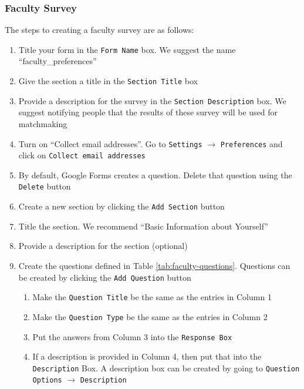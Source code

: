 %
%
\subsubsection{Faculty Survey}

The steps to creating a faculty survey are as follows:
\begin{enumerate}
	\item Title your form in the \texttt{Form Name} box. We suggest the name ``faculty\_preferences''
	\item Give the section a title in the \texttt{Section Title} box
	\item Provide a description for the survey in the \texttt{Section Description} box.
			We suggest notifying people that the results of these survey will be used for matchmaking
	\item Turn on ``Collect email addresses''.  Go to \texttt{Settings} $\rightarrow$ \texttt{Preferences} and click on \texttt{Collect email addresses}
	\item By default, Google Forms creates a question.  Delete that question using the \texttt{Delete} button
	
	\item Create a new section by clicking the \texttt{Add Section} button
	\item Title the section.  We recommend ``Basic Information about Yourself''
	\item Provide a description for the section (optional)
	\item Create the questions defined in Table \ref{tab:faculty-questions}.  Questions can be created by clicking the \texttt{Add Question} button
		\begin{enumerate}
			\item Make the \texttt{Question Title} be the same as the entries in Column 1
			\item Make the \texttt{Question Type} be the same as the entries in Column 2
			\item Put the answers from Column 3 into the \texttt{Response Box}
			\item If a description is provided in Column 4, then put that into the \texttt{Description} Box. A description box can be created by going to \texttt{Question Options} $\rightarrow$ \texttt{Description}			
		\end{enumerate}
		

\end{enumerate}
